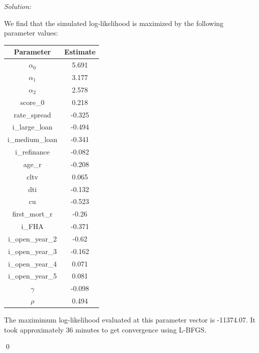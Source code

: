 \documentclass[12pt]{article}
\newenvironment{sol}
    {\emph{Solution:}
    }
    {
    \qed
    }
\begin{document}
\begin{sol}
We find that the simulated log-likelihood is maximized by the following parameter values:
\begin{table}[!htbp]
    \centering
    \begin{tabular}{|c|c|}
        \hline
        Parameter & Estimate\\
        \hline 
        $\alpha_0$ & 5.691 \\
$\alpha_1$ & 3.177 \\
$\alpha_2$ & 2.578 \\
score\_0 & 0.218 \\
rate\_spread & -0.325 \\
i\_large\_loan & -0.494 \\
i\_medium\_loan & -0.341 \\ 
i\_refinance & -0.082 \\
age_r & -0.208 \\
cltv & 0.065 \\
dti & -0.132 \\
cu & -0.523 \\
first\_mort\_r & -0.26 \\
i\_FHA & -0.371 \\
i\_open\_year\_2 &-0.62 \\
i\_open\_year\_3 &-0.162 \\
i\_open\_year\_4 &0.071 \\
i\_open\_year\_5 &0.081 \\
$\gamma$ & -0.098 \\
$\rho$ & 0.494 \\
\hline
    \end{tabular}
\end{table}
The maximimum log-likelihood evaluated at this parameter vector is -11374.07. It took approximately 36 minutes to get convergence using L-BFGS.
\end{sol}
\end{document}
